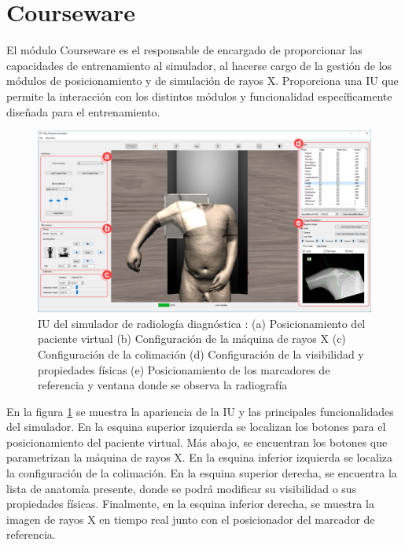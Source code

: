



\section{Courseware}
\label{xray:courseware}

El módulo \ac{Courseware} es el responsable de encargado de proporcionar las capacidades de entrenamiento al simulador, al hacerse cargo de la gestión de los módulos de posicionamiento y de simulación de rayos X. Proporciona una \ac{IU} que permite la interacción con los distintos módulos y funcionalidad específicamente diseñada para el entrenamiento. \begin{figure}
    \centering
    \includegraphics[width=\linewidth]{IMG/uiteacher.png}
    \caption{\ac{IU} del simulador de radiología diagnóstica : (a) Posicionamiento del paciente virtual  (b) Configuración de la máquina de rayos X (c) Configuración de la colimación (d) Configuración de la visibilidad y propiedades físicas (e) Posicionamiento de los marcadores de referencia y ventana donde se observa la radiografía}
    \label{fig:uiusecase}
\end{figure}

En la figura \ref{fig:uiusecase} se muestra la apariencia de la \ac{IU} y las principales funcionalidades del simulador. En la esquina superior izquierda se localizan los botones para el posicionamiento del paciente virtual. Más abajo, se encuentran los botones que parametrizan la máquina de rayos X. En la esquina inferior izquierda se localiza la configuración de la colimación. En la esquina superior derecha, se encuentra la lista de anatomía presente, donde se podrá modificar su visibilidad o sus propiedades físicas. Finalmente, en la esquina inferior derecha, se muestra la imagen de rayos X en tiempo real junto con el posicionador del marcador de referencia.

